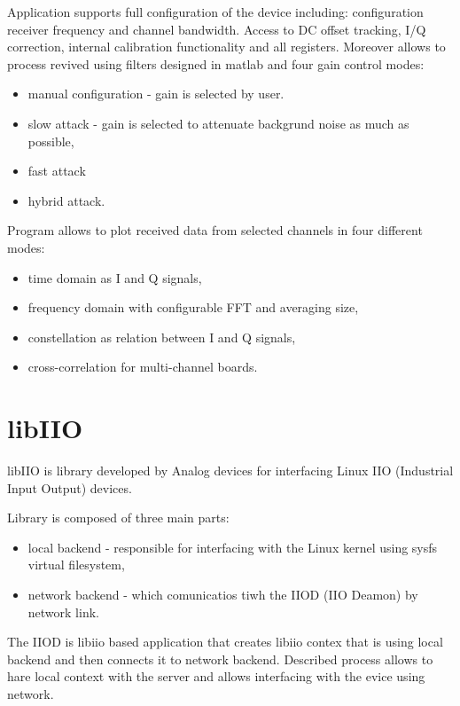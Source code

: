 \documentclass[en,printmode]{mgr}
\begin{document}
			Application supports full configuration of the device including: configuration receiver
			frequency and channel bandwidth. Access to DC offset tracking, I/Q correction,
			internal calibration functionality and all registers. Moreover allows to process revived
			using filters designed in matlab and four gain control modes:
			\begin{itemize}
				\item manual configuration - gain is selected by user.
				\item slow attack - gain is selected to attenuate  backgrund noise as much as
				possible,
				\item fast attack
				\item hybrid attack.
				
			\end{itemize}
			\vspace{5mm}
							
			\noindent
			Program allows to plot received data from selected channels in four different modes:
			\begin{itemize}
				\item time domain as I and Q signals,
				\item frequency domain with configurable FFT and averaging size,
				\item constellation as relation between I and Q signals,
				\item cross-correlation for multi-channel boards.
			\end{itemize}
			
	\section{libIIO}
		libIIO is library developed by Analog devices for interfacing Linux IIO (Industrial
		Input Output) devices.
		
		Library is composed of three main parts:
		\begin{itemize}
			\item local backend - responsible for  interfacing with the Linux kernel using
				sysfs virtual filesystem,
			\item network backend - which comunicatios tiwh the IIOD (IIO Deamon) by network link.	
		\end{itemize}
		
		The IIOD is libiio based application that creates libiio contex that is using local backend
		and then connects it to network backend. Described process allows to hare local context
		with the server and allows interfacing with the evice using network.
\end{document}
